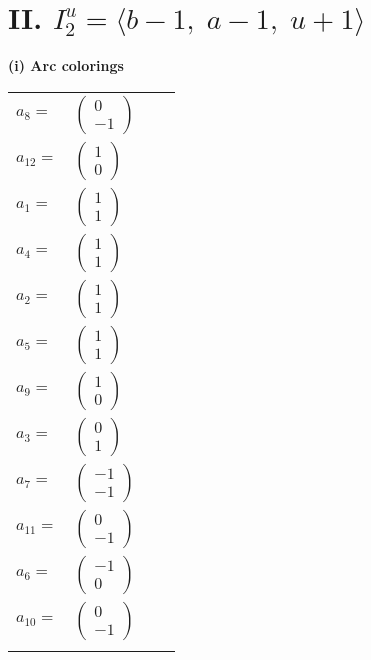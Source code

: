 \documentclass[1p]{elsarticle_modified}
\theoremstyle{definition}
\begin{document}
\centering \section*{II. $I^u_{2}= \langle b-1,\;a-1,\;u+1 \rangle$}
\flushleft \textbf{(i) Arc colorings}\\
\begin{tabular}{m{7pt} m{180pt} m{7pt} m{180pt} }
\flushright $a_{8}=$&$\begin{pmatrix}0\\-1\end{pmatrix}$ \\
\flushright $a_{12}=$&$\begin{pmatrix}1\\0\end{pmatrix}$ \\
\flushright $a_{1}=$&$\begin{pmatrix}1\\1\end{pmatrix}$ \\
\flushright $a_{4}=$&$\begin{pmatrix}1\\1\end{pmatrix}$ \\
\flushright $a_{2}=$&$\begin{pmatrix}1\\1\end{pmatrix}$ \\
\flushright $a_{5}=$&$\begin{pmatrix}1\\1\end{pmatrix}$ \\
\flushright $a_{9}=$&$\begin{pmatrix}1\\0\end{pmatrix}$ \\
\flushright $a_{3}=$&$\begin{pmatrix}0\\1\end{pmatrix}$ \\
\flushright $a_{7}=$&$\begin{pmatrix}-1\\-1\end{pmatrix}$ \\
\flushright $a_{11}=$&$\begin{pmatrix}0\\-1\end{pmatrix}$ \\
\flushright $a_{6}=$&$\begin{pmatrix}-1\\0\end{pmatrix}$ \\
\flushright $a_{10}=$&$\begin{pmatrix}0\\-1\end{pmatrix}$\\&\end{tabular}
\end{document}
